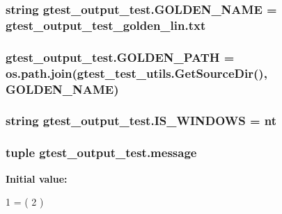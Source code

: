 \subsubsection[{\texorpdfstring{G\+O\+L\+D\+E\+N\+\_\+\+N\+A\+ME}{GOLDEN_NAME}}]{\setlength{\rightskip}{0pt plus 5cm}string gtest\+\_\+output\+\_\+test.\+G\+O\+L\+D\+E\+N\+\_\+\+N\+A\+ME = \textquotesingle{}gtest\+\_\+output\+\_\+test\+\_\+golden\+\_\+lin.\+txt\textquotesingle{}}\hypertarget{namespacegtest__output__test_a317ece7d11d9103a7bdbf0320b64a981}{}\label{namespacegtest__output__test_a317ece7d11d9103a7bdbf0320b64a981}
\subsubsection[{\texorpdfstring{G\+O\+L\+D\+E\+N\+\_\+\+P\+A\+TH}{GOLDEN_PATH}}]{\setlength{\rightskip}{0pt plus 5cm}gtest\+\_\+output\+\_\+test.\+G\+O\+L\+D\+E\+N\+\_\+\+P\+A\+TH = os.\+path.\+join({\bf gtest\+\_\+test\+\_\+utils.\+Get\+Source\+Dir}(), {\bf G\+O\+L\+D\+E\+N\+\_\+\+N\+A\+ME})}\hypertarget{namespacegtest__output__test_aa592d897eeba0ac7e1a3c7d84f182c11}{}\label{namespacegtest__output__test_aa592d897eeba0ac7e1a3c7d84f182c11}
\subsubsection[{\texorpdfstring{I\+S\+\_\+\+W\+I\+N\+D\+O\+WS}{IS_WINDOWS}}]{\setlength{\rightskip}{0pt plus 5cm}string gtest\+\_\+output\+\_\+test.\+I\+S\+\_\+\+W\+I\+N\+D\+O\+WS = \textquotesingle{}nt\textquotesingle{}}\hypertarget{namespacegtest__output__test_a76e823e0e56e3c25aa8b0aab4431f763}{}\label{namespacegtest__output__test_a76e823e0e56e3c25aa8b0aab4431f763}
\subsubsection[{\texorpdfstring{message}{message}}]{\setlength{\rightskip}{0pt plus 5cm}tuple gtest\+\_\+output\+\_\+test.\+message}\hypertarget{namespacegtest__output__test_ac696d0798ad7d08cb2e61070824750e2}{}\label{namespacegtest__output__test_ac696d0798ad7d08cb2e61070824750e2}
{\bfseries Initial value\+:}
\begin{DoxyCode}
1 = (
2           )
\end{DoxyCode}
